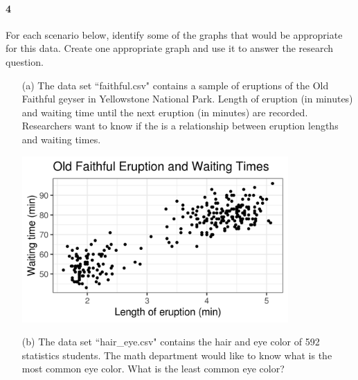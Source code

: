 \documentclass{article}
\begin{document}
\begin{flushleft}
\begin{itemize}
\end{itemize}


\newpage
\paragraph{4} For each scenario below, identify some of the graphs that would be appropriate for this data. Create one appropriate graph and use it to answer the research question.

\begin{itemize}
\item [(a)] The data set ``faithful.csv" contains a sample of eruptions of the Old Faithful geyser in Yellowstone National Park. Length of eruption (in minutes) and waiting time until the next eruption (in minutes) are recorded. Researchers want to know if the is a relationship between eruption lengths and waiting times.\\
\bigskip
{}
\bigskip

{\centering
\includegraphics[width=4in]{images/group04_Q4_a}
\par}


\bigskip
{}



\newpage
\item[(b)] The data set ``hair\_eye.csv" contains the hair and eye color of 592 statistics students. The math department would like to know what is the most common eye color. What is the least common eye color?\\
\bigskip
{}
\bigskip


\end{itemize}
\end{flushleft}
\end{document}
